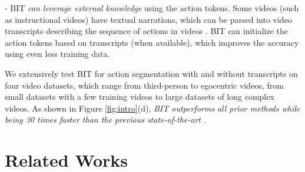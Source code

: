 \documentclass[10pt,twocolumn,letterpaper]{article}
\newcommand{\0}{\boldsymbol{0}}
\begin{document}
- BIT \emph{can leverage external knowledge} using the action tokens. 
Some videos (such as instructional videos) have textual narrations, which can be parsed into video transcripts describing the sequence of actions in videos \cite{Richard-Viterbi:CVPR18,Ding:CVPR18,Chang:CVPR19,Li:ICCV19,Lu:ICCV21,Souri:PAMI21,Richard:CVPR18,Li:CVPR20,Li:CVPR21-weaksup,Fayyaz:CVPR20, Shen:CVPR22,Li:CVPR21-timesup,Rahaman:ECCV22}. BIT can initialize the action tokens based on transcripts (when available), which improves the accuracy using even less training data. 

We extensively test BIT for action segmentation with and without transcripts on four video datasets, which range from third-person to egocentric videos, from small datasets with a few training videos to large datasets of long complex videos. 
As shown in Figure \ref{fig:intro}(d), \emph{BIT outperforms all prior methods while being 30 times faster than the previous state-of-the-art} \cite{Behrmann:ECCV22}.



\section{Related Works}
\vspace{-2mm}
\end{document}
